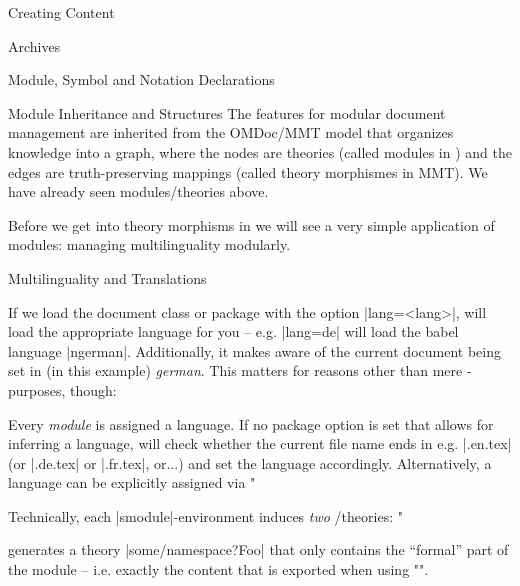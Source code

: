\begin{sfragment}{Creating \sTeX Content}
  \begin{sfragment}[id=sec.stexarchives]{\sTeX Archives}
    
  \end{sfragment}

  \begin{sfragment}[id=sec.decls]{Module, Symbol and Notation Declarations}
    

    
  \end{sfragment}

  \begin{sfragment}{Module Inheritance and Structures}
    The \sTeX features for modular document management are inherited from the OMDoc/MMT
    model that organizes knowledge into a graph, where the nodes are theories (called
    modules in \sTeX) and the edges are truth-preserving mappings (called theory
    morphismes in MMT). We have already seen modules/theories above.

    Before we get into theory morphisms in \sTeX we will see a very simple application of
    modules: managing multilinguality modularly.

    \begin{sfragment}{Multilinguality and Translations}

      If we load the \sTeX document class or package with the option |lang=<lang>|, \sTeX
      will load the appropriate  language for you -- e.g. |lang=de| will load
      the babel language |ngerman|. Additionally, it makes \sTeX aware of the current
      document being set in (in this example) \emph{german}. This matters for reasons
      other than mere -purposes, though:

      Every \emph{module} is assigned a language. If no \sTeX
      package option is set that allows for inferring a language,
      \sTeX will check whether the current file name ends in
      e.g. |.en.tex| (or |.de.tex| or |.fr.tex|, or...) and
      set the language accordingly. Alternatively, a language
      can be explicitly assigned via 
      \stexcode"\fi

      \begin{mmtbox}
        Technically, each |smodule|-environment induces \emph{two}
        \omdoc/\mmt theories:
        \stexcode"\fi
        generates a theory |some/namespace?Foo| that only contains
        the ``formal'' part of the module -- i.e. exactly the
        content that is exported when using \stexcode"\importmodule".


\end{mmtbox}
\end{sfragment}
\end{sfragment}
\end{sfragment}
